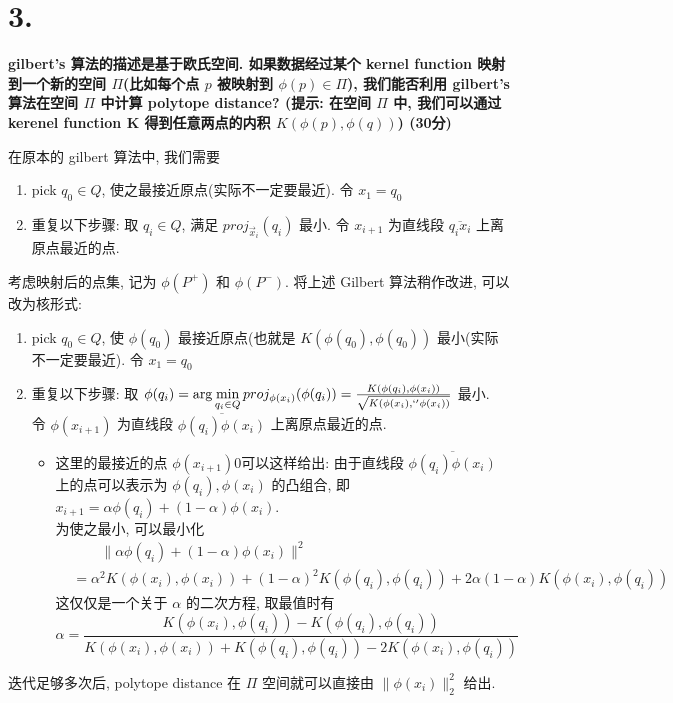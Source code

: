\documentclass[UTF8]{article}
\newcommand{\jumpLine} {\hspace*{\fill} \par}
\begin{document}
\section*{3.}
\noindent \textbf{gilbert's 算法的描述是基于欧氏空间. 如果数据经过某个 kernel function 映射到一个新的空间 $\Pi$(比如每个点 $p$ 被映射到 $\phi(p)\in\Pi$), 我们能否利用 gilbert's 算法在空间 $\Pi$ 中计算 polytope distance? (提示: 在空间 $\Pi$ 中, 我们可以通过 kerenel function K 得到任意两点的内积 $K(\phi(p), \phi(q))$) (30分)} \\\jumpLine\noindent
在原本的 gilbert 算法中, 我们需要
\begin{enumerate}
	\item pick $q_0 \in Q$, 使之最接近原点(实际不一定要最近). 令 $x_1 = q_0$
	\item 重复以下步骤: 取 $q_i \in Q$, 满足 $proj_{\vec{x}_i}(q_i)$ 最小. 令 $x_{i+1}$ 为直线段 $\overline{q_i x_i}$ 上离原点最近的点. 
\end{enumerate}
考虑映射后的点集, 记为 $\phi(P^+)$ 和 $\phi(P^-)$. 将上述 Gilbert 算法稍作改进, 可以改为核形式:
\begin{enumerate}
	\item pick $q_0 \in Q$, 使 $\phi(q_0)$ 最接近原点(也就是 $K(\phi(q_0), \phi(q_0))$ 最小(实际不一定要最近). 令 $x_1 = q_0$
	\item 重复以下步骤: 取 $\phi(q_i) =\arg\min\limits_{q_i \in Q} proj_{\phi({x}_i)}(\phi(q_i))=\frac{K(\phi(q_i), \phi(x_i))}{\sqrt{K(\phi(x_i), `'\phi(x_i))}}$ 最小.  \\
	令 $\phi(x_{i+1})$ 为直线段 $\overline{\phi(q_i) \phi(x_i)}$ 上离原点最近的点. 
	\begin{itemize}
		\item 这里的最接近的点 $\phi(x_{i+1})0$可以这样给出: 由于直线段 $\overline{\phi(q_i) \phi(x_i)}$ 上的点可以表示为 $\phi(q_i), \phi(x_i)$ 的凸组合, 即 $x_{i+1}=\alpha\phi(q_i) + (1-\alpha) \phi(x_i)$. \\
		为使之最小, 可以最小化
		\begin{align*}
			&\qquad\|\alpha\phi(q_i) + (1-\alpha) \phi(x_i)\|^2 \\
			&=\alpha^2 K(\phi(x_i), \phi(x_i)) + (1-\alpha)^2 K(\phi(q_i), \phi(q_i)) + 2\alpha(1-\alpha)K(\phi(x_i), \phi(q_i))
		\end{align*}
		这仅仅是一个关于 $\alpha$ 的二次方程, 取最值时有
		$$\alpha=\frac{K(\phi(x_i), \phi(q_i)) - K(\phi(q_i), \phi(q_i))}{K(\phi(x_i), \phi(x_i)) + K(\phi(q_i), \phi(q_i)) - 2K(\phi(x_i), \phi(q_i))}$$
	\end{itemize}
\end{enumerate}
迭代足够多次后, polytope distance 在 $\Pi$ 空间就可以直接由 $\|\phi(x_i)\|_2^2$ 给出.
\end{document}
